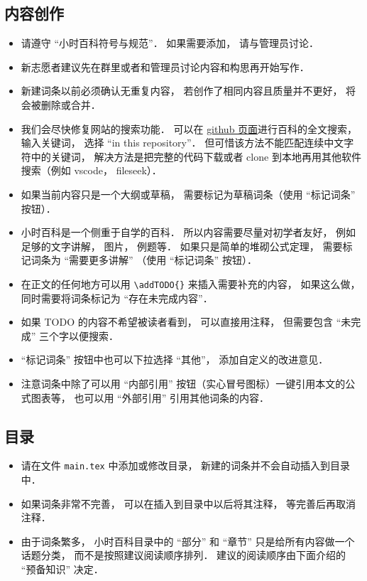 
\subsection{内容创作}
\begin{itemize}
\item 请遵守 “小时百科符号与规范”． 如果需要添加， 请与管理员讨论．
\item 新志愿者建议先在群里或者和管理员讨论内容和构思再开始写作．
\item 新建词条以前必须确认无重复内容， 若创作了相同内容且质量并不更好， 将会被删除或合并．
\item 我们会尽快修复网站的搜索功能． 可以在 \href{https://github.com/MacroUniverse/PhysWiki-log}{github 页面}进行百科的全文搜索， 输入关键词， 选择 “in this repository”． 但可惜该方法不能匹配连续中文字符中的关键词， 解决方法是把完整的代码下载或者 clone 到本地再用其他软件搜索（例如 vscode， fileseek）．
\item 如果当前内容只是一个大纲或草稿， 需要标记为草稿词条（使用 “标记词条” 按钮）．
\item 小时百科是一个侧重于自学的百科． 所以内容需要尽量对初学者友好， 例如足够的文字讲解， 图片， 例题等． 如果只是简单的堆砌公式定理， 需要标记词条为 “需要更多讲解” （使用 “标记词条” 按钮）．
\item 在正文的任何地方可以用 \verb|\addTODO{}| 来插入需要补充的内容， 如果这么做， 同时需要将词条标记为 “存在未完成内容”．
\item 如果 TODO 的内容不希望被读者看到， 可以直接用注释， 但需要包含 “未完成” 三个字以便搜索．
\item “标记词条” 按钮中也可以下拉选择 “其他”， 添加自定义的改进意见．
\item 注意词条中除了可以用 “内部引用” 按钮（实心冒号图标）一键引用本文的公式图表等， 也可以用 “外部引用” 引用其他词条的内容．
\end{itemize}

\subsection{目录}
\begin{itemize}
\item 请在文件 \verb|main.tex| 中添加或修改目录， 新建的词条并不会自动插入到目录中．
\item 如果词条非常不完善， 可以在插入到目录中以后将其注释， 等完善后再取消注释．
\item 由于词条繁多， 小时百科目录中的 “部分” 和 “章节” 只是给所有内容做一个话题分类， 而不是按照建议阅读顺序排列． 建议的阅读顺序由下面介绍的 “预备知识” 决定．
\end{itemize}

